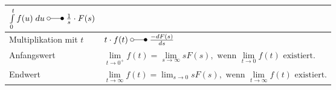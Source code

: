 \begin{tabular}{|ll|}
	 			$\int\limits_0^t f(u) \; du \; \laplace \; \frac{1}{s}\cdot F(s)$ \\
	 		\hline
	 			Multiplikation mit $t$ &
	 			$t\cdot f(t)  \; \laplace \; \frac{-d F(s)}{d s}$ \\
 			\hline
 			\hline
	 			Anfangswert &
	 			$\lim\limits_{t\rightarrow 0^+} f(t) = \lim\limits_{s\rightarrow \infty} sF(s),\text{~wenn
	 			}  \lim\limits_{t\rightarrow 0} f(t)\text{~existiert}.$ \\
 			\hline
	 			Endwert &
	 			$\lim\limits_{t\rightarrow \infty} f(t) = \lim_{s\rightarrow 0} sF(s),\text{~wenn
	 			}  \lim\limits_{t\rightarrow \infty} f(t)\text{~existiert}.$ \\
	 		\hline
       	\end{tabular}
		\renewcommand{\arraystretch}{\arraystretchOriginal}
		
		
		
		
		
		
		
		
	

